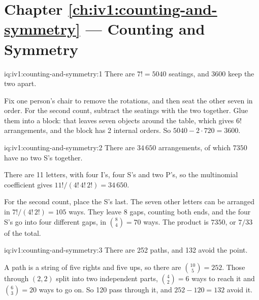 \section*{Chapter \ref{ch:iv1:counting-and-symmetry} --- Counting and Symmetry}

\begin{solution}{iq:iv1:counting-and-symmetry:1}
There are $7! = 5040$ seatings, and $3600$ keep the two apart.

Fix one person's chair to remove the rotations, and then seat the other seven in order. For the second count, subtract the seatings with the two together. Glue them into a block: that leaves seven objects around the table, which gives $6!$ arrangements, and the block has 2 internal orders. So $5040 - 2 \cdot 720 = 3600$.

\end{solution}

\begin{solution}{iq:iv1:counting-and-symmetry:2}
There are $34\,650$ arrangements, of which $7350$ have no two S's together.

There are 11 letters, with four I's, four S's and two P's, so the multinomial coefficient gives $11!/(4!\,4!\,2!) = 34\,650$.

For the second count, place the S's last. The seven other letters can be arranged in $7!/(4!\,2!) = 105$ ways. They leave 8 gaps, counting both ends, and the four S's go into four different gaps, in $\binom{8}{4} = 70$ ways. The product is $7350$, or $7/33$ of the total.

\end{solution}

\begin{solution}{iq:iv1:counting-and-symmetry:3}
There are 252 paths, and 132 avoid the point.

A path is a string of five rights and five ups, so there are $\binom{10}{5} = 252$. Those through $(2, 2)$ split into two independent parts, $\binom{4}{2} = 6$ ways to reach it and $\binom{6}{3} = 20$ ways to go on. So 120 pass through it, and $252 - 120 = 132$ avoid it.

\end{solution}

